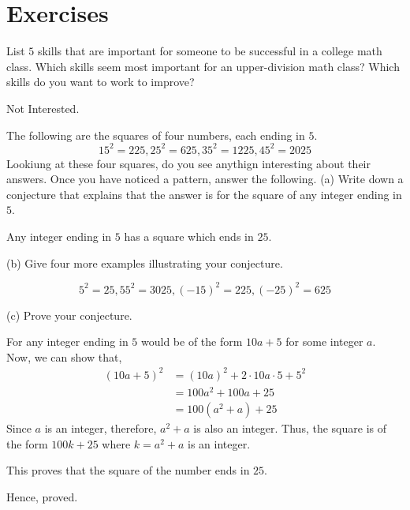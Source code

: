 \section*{Exercises}

\begin{problem}
	List $5$ skills that are important for someone to be successful in a college math class. Which skills seem most important for an upper-division math class? Which skills do you want to work to improve?
\end{problem}
\begin{solution}Not Interested.\end{solution}

\begin{problem}
	The following are the squares of four numbers, each ending in $5$.
	$$15^2 = 225, 25^2 = 625, 35^2 = 1225, 45^2 = 2025$$
	Lookiung at these four squares, do you see anythign interesting about their answers. Once you have noticed a pattern, answer the following.
	\bigbreak
	(a) Write down a conjecture that explains that the answer is for the square of any integer ending in $5$.

	\begin{solution}
		\begin{named}[Conjecture]
			Any integer ending in $5$ has a square which ends in $25$.
		\end{named}
	\end{solution}

	(b) Give four more examples illustrating your conjecture.
	\begin{solution}
		$$5^2 = 25, 55^2 = 3025, (-15)^2 = 225, (-25)^2 = 625$$
	\end{solution}

	(c) Prove your conjecture.
	\begin{solution}
		For any integer ending in $5$ would be of the form $10a+5$ for some integer $a$. Now, we can show that,
		\begin{align}
			(10a+5)^2 &= (10a)^2 + 2 \cdot 10a \cdot 5 + 5^2 \\
				&= 100a^2 + 100a + 25 \\
				&= 100(a^2+a) + 25
		\end{align}
		Since $a$ is an integer, therefore, $a^2 + a$ is also an integer.
		Thus, the square is of the form $100k+25$ where $k = a^2+a$ is an integer.

		This proves that the square of the number ends in $25$.

		Hence, proved.
	\end{solution}
\end{problem}

